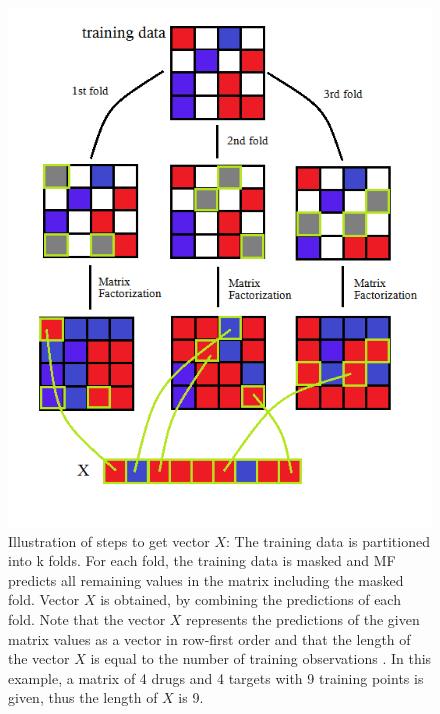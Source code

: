 \begin{figure}
\begin{center}
\includegraphics[scale=0.6]{ccrf_X.png}
\end{center}
\caption{Illustration of steps to get vector $X$: The training data is partitioned into k folds. For each fold, the training data is masked and MF predicts all remaining values in the matrix including the masked fold. Vector $X$ is obtained, by combining the predictions of each fold. Note that the vector $X$ represents the predictions of the given matrix values as a vector in row-first order and that the length of the vector $X$ is equal to the number of training observations . In this example, a matrix of 4 drugs and 4 targets with 9 training points is given, thus the length of $X$ is 9.}
\label{fig:ccrf_X}
\end{figure}


